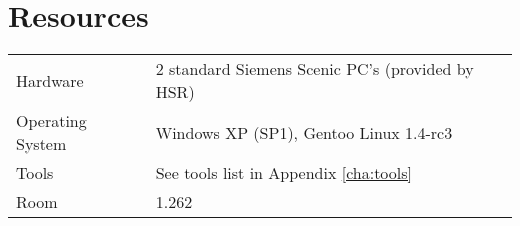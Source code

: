 \chapter{Resources}
\label{cha:resources}

\begin{tabular}{ll}
Hardware					& 2 standard Siemens Scenic PC's (provided by HSR)\\
Operating System	& Windows XP (SP1), Gentoo Linux 1.4-rc3\\
Tools							& See tools list in Appendix \ref{cha:tools}\\
Room							& 1.262
\end{tabular}
